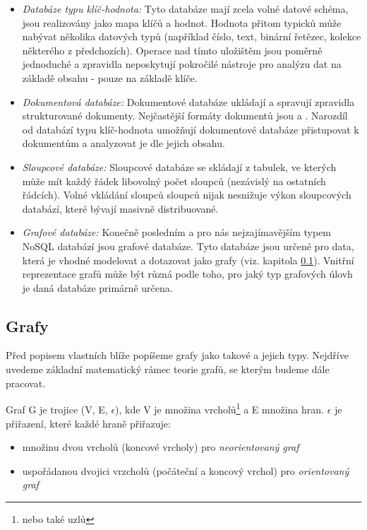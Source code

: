 \begin{itemize}
  \item{\textit{Databáze typu klíč-hodnota:}} Tyto databáze mají zcela volné datové schéma, jsou realizovány jako mapa klíčů a hodnot. Hodnota přitom typicků může nabývat několika datových typů (například číslo, text, binární řetězec, kolekce některého z předchozích). Operace nad tímto uložištěm jsou poměrně jednoduché a zpravidla neposkytují pokročilé nástroje pro analýzu dat na základě obsahu - pouze na základě klíče. 
  \item{\textit{Dokumentová databáze:}} Dokumentové databáze ukládají a spravují zpravidla strukturované dokumenty. Nejčastější formáty dokumentů jsou  a . Narozdíl od databází typu klíč-hodnota umožňují dokumentové databáze přistupovat k dokumentům a analyzovat je dle jejich obsahu. 
  \item{\textit{Sloupcové databáze:}} Sloupcové databáze se skládají z tabulek, ve kterých může mít každý řádek libovolný počet sloupců (nezávislý na ostatních řádcích). Volné vkládání sloupců sloupců nijak nesnižuje výkon sloupcových databází, které bývají masivně distribuované.
  \item{\textit{Grafové databáze:}} Konečně posledním a pro nás nejzajímavějším typem NoSQL databází jsou grafové databáze. Tyto databáze jsou určené pro data, která je vhodné modelovat a dotazovat jako grafy (viz. kapitola \ref{sec:gdb-grafy}). Vnitřní reprezentace grafů může být různá podle toho, pro jaký typ grafových úlovh je daná databáze primárně určena.
\end{itemize}


\subsection{Grafy}
\label{sec:gdb-grafy}
Před popisem vlastních  blíže popíšeme grafy jako takové a jejich typy. Nejdříve uvedeme základní matematický rámec teorie grafů, se kterým budeme dále pracovat. 

Graf G je trojice (V, E, $\epsilon$), kde V je množina vrcholů\footnote{nebo také uzlů} a E množina hran. $\epsilon$ je přiřazení, které každé hraně přiřazuje: 
\begin{itemize} 
	\item{} množinu dvou vrcholů (koncové vrcholy) pro \textit{neorientovaný graf}
	\item{} uspořádanou dvojici vrzcholů (počáteční a koncový vrchol) pro \textit{orientovaný graf}
\end{itemize}

